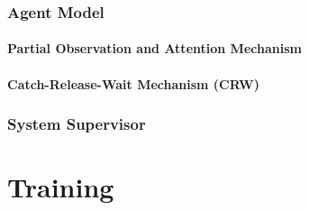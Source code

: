 \documentclass{article}
\begin{document}

	        \subsubsection{Agent Model}


\paragraph{Partial Observation and Attention Mechanism}


                \paragraph{Catch-Release-Wait Mechanism (CRW)}

            \subsubsection{System Supervisor}

	\section{Training}
\end{document}
